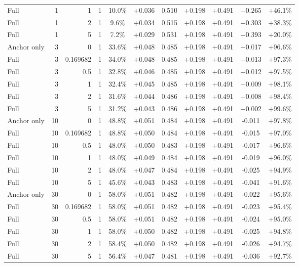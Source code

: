 \begin{table}[htbp]
\begin{tabular}{lrrrccccccc}
Full & 1 & 1 & 1 & 10.0\% & +0.036 & 0.510 & +0.198 & +0.491 & +0.265 & +46.1\% \\
Full & 1 & 2 & 1 & 9.6\% & +0.034 & 0.515 & +0.198 & +0.491 & +0.303 & +38.3\% \\
Full & 1 & 5 & 1 & 7.2\% & +0.029 & 0.531 & +0.198 & +0.491 & +0.393 & +20.0\% \\
Anchor only & 3 & 0 & 1 & 33.6\% & +0.048 & 0.485 & +0.198 & +0.491 & +0.017 & +96.6\% \\
Full & 3 & 0.169682 & 1 & 34.0\% & +0.048 & 0.485 & +0.198 & +0.491 & +0.013 & +97.3\% \\
Full & 3 & 0.5 & 1 & 32.8\% & +0.046 & 0.485 & +0.198 & +0.491 & +0.012 & +97.5\% \\
Full & 3 & 1 & 1 & 32.4\% & +0.045 & 0.485 & +0.198 & +0.491 & +0.009 & +98.1\% \\
Full & 3 & 2 & 1 & 31.6\% & +0.044 & 0.486 & +0.198 & +0.491 & +0.008 & +98.4\% \\
Full & 3 & 5 & 1 & 31.2\% & +0.043 & 0.486 & +0.198 & +0.491 & +0.002 & +99.6\% \\
Anchor only & 10 & 0 & 1 & 48.8\% & +0.051 & 0.484 & +0.198 & +0.491 & -0.011 & +97.8\% \\
Full & 10 & 0.169682 & 1 & 48.8\% & +0.050 & 0.484 & +0.198 & +0.491 & -0.015 & +97.0\% \\
Full & 10 & 0.5 & 1 & 48.0\% & +0.050 & 0.483 & +0.198 & +0.491 & -0.017 & +96.6\% \\
Full & 10 & 1 & 1 & 48.0\% & +0.049 & 0.484 & +0.198 & +0.491 & -0.019 & +96.0\% \\
Full & 10 & 2 & 1 & 48.0\% & +0.047 & 0.484 & +0.198 & +0.491 & -0.025 & +94.9\% \\
Full & 10 & 5 & 1 & 45.6\% & +0.043 & 0.483 & +0.198 & +0.491 & -0.041 & +91.6\% \\
Anchor only & 30 & 0 & 1 & 58.0\% & +0.051 & 0.482 & +0.198 & +0.491 & -0.022 & +95.6\% \\
Full & 30 & 0.169682 & 1 & 58.0\% & +0.051 & 0.482 & +0.198 & +0.491 & -0.023 & +95.4\% \\
Full & 30 & 0.5 & 1 & 58.0\% & +0.051 & 0.482 & +0.198 & +0.491 & -0.024 & +95.0\% \\
Full & 30 & 1 & 1 & 58.0\% & +0.050 & 0.482 & +0.198 & +0.491 & -0.025 & +94.8\% \\
Full & 30 & 2 & 1 & 58.4\% & +0.050 & 0.482 & +0.198 & +0.491 & -0.026 & +94.7\% \\
Full & 30 & 5 & 1 & 56.4\% & +0.047 & 0.481 & +0.198 & +0.491 & -0.036 & +92.7\% \\

\end{tabular}
\end{table}
